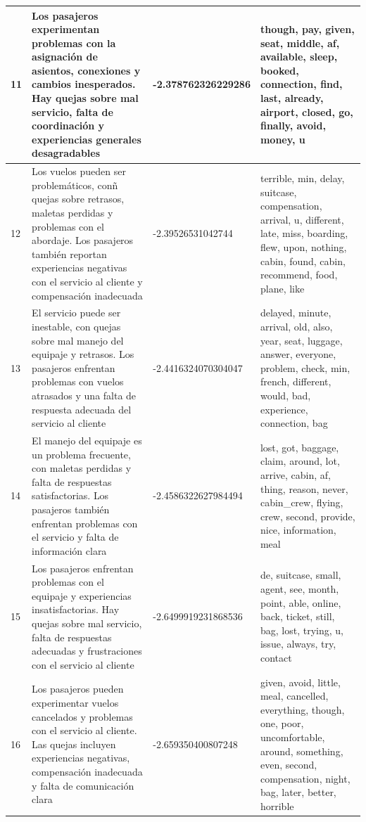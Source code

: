 \documentclass{report}
\begin{document}
{\begin{longtable}{|p{1cm}|p{4cm}|p{4cm}|p{6cm}|}
                    \hline
                    11 & Los pasajeros experimentan problemas con la asignación de asientos, conexiones y cambios inesperados. Hay quejas sobre mal servicio, falta de coordinación y experiencias generales desagradables & -2.378762326229286 & though, pay, given, seat, middle, af, available, sleep, booked, connection, find, last, already, airport, closed, go, finally, avoid, money, u \\
                    \hline
                    12 & Los vuelos pueden ser problemáticos, conñ quejas sobre retrasos, maletas perdidas y problemas con el abordaje. Los pasajeros también reportan experiencias negativas con el servicio al cliente y compensación inadecuada & -2.39526531042744 & terrible, min, delay, suitcase, compensation, arrival, u, different, late, miss, boarding, flew, upon, nothing, cabin, found, cabin, recommend, food, plane, like \\
                    \hline
                    13 & El servicio puede ser inestable, con quejas sobre mal manejo del equipaje y retrasos. Los pasajeros enfrentan problemas con vuelos atrasados y una falta de respuesta adecuada del servicio al cliente & -2.4416324070304047 & delayed, minute, arrival, old, also, year, seat, luggage, answer, everyone, problem, check, min, french, different, would, bad, experience, connection, bag \\
                    \hline
                    14 & El manejo del equipaje es un problema frecuente, con maletas perdidas y falta de respuestas satisfactorias. Los pasajeros también enfrentan problemas con el servicio y falta de información clara & -2.4586322627984494 & lost, got, baggage, claim, around, lot, arrive, cabin, af, thing, reason, never, cabin\_crew, flying, crew, second, provide, nice, information, meal \\
                    \hline
                    15 & Los pasajeros enfrentan problemas con el equipaje y experiencias insatisfactorias. Hay quejas sobre mal servicio, falta de respuestas adecuadas y frustraciones con el servicio al cliente & -2.6499919231868536 & de, suitcase, small, agent, see, month, point, able, online, back, ticket, still, bag, lost, trying, u, issue, always, try, contact \\
                    \hline
                    16 & Los pasajeros pueden experimentar vuelos cancelados y problemas con el servicio al cliente. Las quejas incluyen experiencias negativas, compensación inadecuada y falta de comunicación clara & -2.659350400807248 & given, avoid, little, meal, cancelled, everything, though, one, poor, uncomfortable, around, something, even, second, compensation, night, bag, later, better, horrible \\

\end{longtable}}
\end{document}
